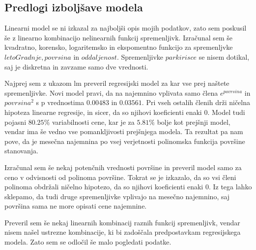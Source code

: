 \documentclass[a4paper, 12pt]{article}
\begin{document}
\subsection{Predlogi izboljšave modela}

Linearni model se ni izkazal za najboljši opis mojih podatkov, zato sem
poskusil še z linearno kombinacijo nelinearnih funkcij spremenljivk.
Izračunal sem še kvadratno, korensko, logaritemsko in ekspomentno funkcijo
za spremenljvke $ letoGradnje, povrsina $ in $ oddaljenost $. Spremenljivke
$ parkirisce $ se nisem dotikal, saj je diskretna in zavzame samo dve
vrednosti.

Najprej sem z ukazom {\sf lm} preveril regresijski model za kar vse prej
naštete spremenljivke. Novi model pravi, da na najemnino vplivata samo člena
$ e^{povrsina} $ in $ povrsina^{2} $ s p vrednostima $ 0.00483 $ in $ 0.03561 $.
Pri vseh ostalih členih drži ničelna hipoteza linearne regresije, in sicer, da
so njihovi koeficienti enaki $ 0 $. Model tudi pojasni $ 80.25\% $ variabilnosti
cene, kar je za $ 5.81\% $ bolje kot prejšnji model, vendar ima še vedno vse
pomankljivosti prejšnjega modela. Ta rezultat pa nam pove, da je mesečna
najemnina po vsej verjetnosti polinomska funkcija površine stanovanja.

Izračunal sem še nekaj potenčnih vrednosti površine in preveril model samo za
ceno v odvisnosti od polinoma površine. Tokrat se je izkazalo, da so vsi členi
polinoma obdržali ničelno hipotezo, da so njihovi koeficienti enaki $ 0 $. Iz
tega lahko sklepamo, da tudi druge spremenljivke vplivajo na mesečno najemnino,
saj površina sama ne more opisati cene najemnine.

Preveril sem še nekaj linearnih kombinacij raznih funkcij spremenljivk, vendar
nisem našel ustrezne kombinacije, ki bi zadoščala predpostavkam regresijskega
modela. Zato sem se odločil še malo pogledati podatke.
\end{document}
